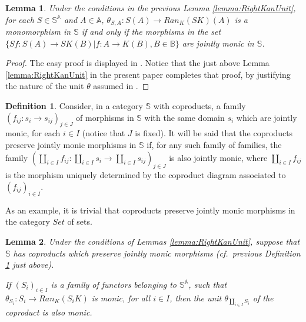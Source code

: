 \documentclass[12pt,a4paper]{amsart}
\newtheorem{lemma}{Lemma}[section]
\theoremstyle{definition}
\newtheorem{definition}{Definition}[section]
\begin{document}
\begin{lemma}\label{lemma:jointlymonicRightKanUnit}
Under the conditions in the previous Lemma \ref{lemma:RightKanUnit}, for each $S\in\mathbb{S}^\mathbb{A}$ and $A\in\mathbb{A}$, $\theta_{S,A}:S(A)\rightarrow Ran_K(SK)(A)$ is a monomorphism in $\mathbb{S}$ if and only if the morphisms in the set $\{Sf:S(A)\rightarrow SK(B)|f:A\rightarrow K(B),B\in\mathbb{B}\}$ are jointly monic in $\mathbb{S}$.
\end{lemma}
\begin{proof}
The easy proof is displayed in \cite[Lemma 4.1]{X:well behaved}. Notice that the just above Lemma \ref{lemma:RightKanUnit} in the present paper completes that proof, by justifying the nature of the unit $\theta$ assumed in \cite[Lemma 4.1]{X:well behaved}.\end{proof}

\begin{definition}\label{def:copresjointlymonic}
Consider, in a category $\mathbb{S}$ with coproducts, a family $(f_{ij}:s_i\rightarrow s_{ij})_{j\in J}$ of morphisms in $\mathbb{S}$ with the same domain $s_i$ which are jointly monic, for each $i\in I$ (notice that $J$ is fixed). It will be said that the coproducts preserve jointly monic morphisms in $\mathbb{S}$ if, for any such family of families, the family $(\coprod_{i\in I}f_{ij}:\coprod_{i\in I}s_i\rightarrow \coprod_{i\in I}s_{ij})_{j\in J}$ is also jointly monic, where $\coprod_{i\in I}f_{ij}$ is the morphism uniquely determined by the coproduct diagram associated to $(f_{ij})_{i\in I}$.

As an example, it is trivial that coproducts preserve jointly monic morphisms in the category $Set$ of sets.
\end{definition}

\begin{lemma}\label{lemma:RightKanCoprodUnitsMonic}
Under the conditions of Lemmas \ref{lemma:RightKanUnit}, suppose that $\mathbb{S}$ has coproducts which preserve jointly monic morphisms (cf.\ previous Definition \ref{def:copresjointlymonic} just above).

If $(S_i)_{i\in I}$ is a family of functors belonging to $\mathbb{S}^\mathbb{A}$, such that $\theta_{S_i}:S_i\rightarrow Ran_K(S_iK)$ is monic, for all $i\in I$, then the unit $\theta_{\coprod_{i\in I}S_i}$ of the coproduct is also monic.
\end{lemma}
\end{document}
